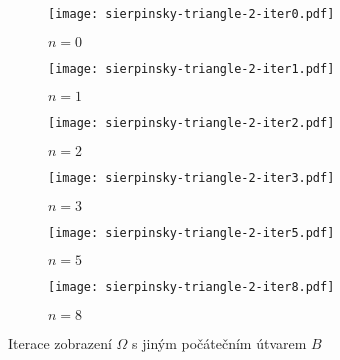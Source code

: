\begin{figure}[H]
    \centering
    \begin{subfigure}{0.45\textwidth}
        \centering
        \texttt{[image: sierpinsky-triangle-2-iter0.pdf]}
        \begin{center}
            $n=0$
        \end{center}
    \end{subfigure}
    \qquad
    \vspace{1cm}
    \begin{subfigure}{0.45\textwidth}
        \centering
        \texttt{[image: sierpinsky-triangle-2-iter1.pdf]}
        \begin{center}
            $n=1$
        \end{center}
    \end{subfigure}
    \qquad
    \begin{subfigure}{0.45\textwidth}
        \centering
        \texttt{[image: sierpinsky-triangle-2-iter2.pdf]}
        \begin{center}
            $n=2$
        \end{center}
    \end{subfigure}
    \qquad
    \vspace{1cm}
    \begin{subfigure}{0.45\textwidth}
        \centering
        \texttt{[image: sierpinsky-triangle-2-iter3.pdf]}
        \begin{center}
            $n=3$
        \end{center}
    \end{subfigure}
    \qquad
    \begin{subfigure}{0.45\textwidth}
        \centering
        \texttt{[image: sierpinsky-triangle-2-iter5.pdf]}
        \begin{center}
            $n=5$
        \end{center}
    \end{subfigure}
    \qquad
    \begin{subfigure}{0.45\textwidth}
        \centering
        \texttt{[image: sierpinsky-triangle-2-iter8.pdf]}
        \begin{center}
            $n=8$
        \end{center}
    \end{subfigure}
    \caption{Iterace zobrazení $\Omega$ s jiným počátečním útvarem $B$}
    \label{fig:iterace-zobrazeni-omega-sierpinskeho-trojuhelnik-jiny-poc-utvar}
\end{figure}
